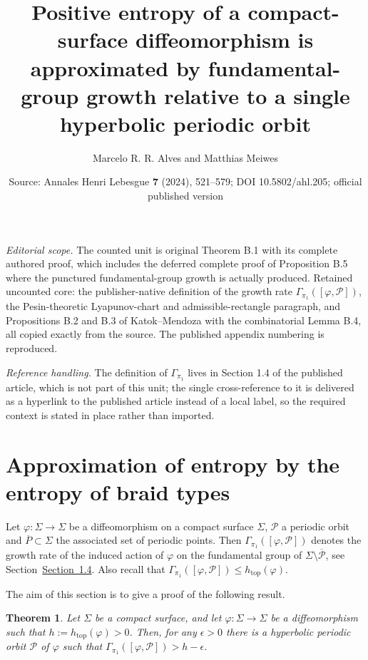 \documentclass[10pt,a4paper]{amsart}
\title[Entropy approximated by punctured fundamental-group growth]{Positive entropy of a compact-surface diffeomorphism is approximated by fundamental-group growth relative to a single hyperbolic periodic orbit}
\author{Marcelo R. R. Alves and Matthias Meiwes}
\date{Source: Annales Henri Lebesgue \textbf{7} (2024), 521--579; DOI 10.5802/ahl.205; official published version}
\numberwithin{equation}{section}
\newcommand{\topo}{\mathrm{top}}
\newcommand{\clP}{\mathcal{P}}
\newtheorem{theo}{Theorem}[section]
\theoremstyle{definition}
\theoremstyle{remark}
\begin{document}
\maketitle
\noindent\textit{Editorial scope.} The counted unit is original Theorem B.1 with its complete authored proof, which includes the deferred complete proof of Proposition B.5 where the punctured fundamental-group growth is actually produced. Retained uncounted core: the publisher-native definition of the growth rate $\Gamma_{\pi_1}([\varphi,\mathcal{P}])$, the Pesin-theoretic Lyapunov-chart and admissible-rectangle paragraph, and Propositions B.2 and B.3 of Katok--Mendoza with the combinatorial Lemma B.4, all copied exactly from the source. The published appendix numbering is reproduced.\par
\noindent\textit{Reference handling.} The definition of $\Gamma_{\pi_1}$ lives in Section 1.4 of the published article, which is not part of this unit; the single cross-reference to it is delivered as a hyperlink to the published article instead of a local label, so the required context is stated in place rather than imported.
\appendix
\setcounter{section}{1}
\section{Approximation of entropy by the entropy of braid types} \label{appendix:approx}

Let $\varphi: \Sigma \to \Sigma$ be a diffeomorphism on a compact surface $\Sigma$, $\clP$ a periodic orbit and $\overline{P}\subset \Sigma$ the associated set of periodic points. Then $\Gamma_{\pi_1}([\varphi, \clP])$ denotes the growth rate of the induced action of $\varphi$ on the fundamental group of $\Sigma \setminus \overline{\clP}$, see Section~\href{https://ahl.centre-mersenne.org/item/AHL_2024__7__521_0/}{Section~1.4}. Also recall that $\Gamma_{\pi_1}([\varphi, \clP]) \leq h_{\topo}(\varphi)$.

The aim of this section is to give a proof of the following result.

\begin{theo}\label{thm:approximation}
Let $\Sigma$ be a compact surface, and let $\varphi: \Sigma\to \Sigma$ be a diffeomorphism such that $h:=h_{\topo}(\varphi)>0$. Then, for any $\epsilon>0$ there is a hyperbolic periodic orbit $\clP$ of $\varphi$ such that $\Gamma_{\pi_1}([\varphi,\clP])> h - \epsilon$.
\end{theo}
\end{document}
